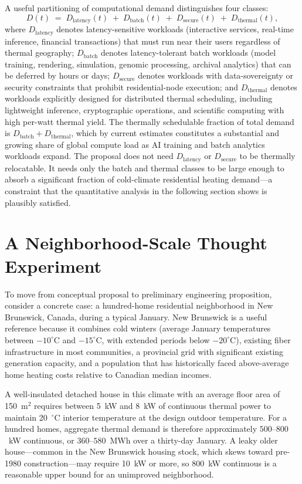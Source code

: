 \documentclass[12pt, oneside]{article}
\begin{document}
A useful partitioning of computational demand distinguishes four classes:
\[
D(t) \;=\; D_{\text{latency}}(t) \;+\; D_{\text{batch}}(t) \;+\; D_{\text{secure}}(t) \;+\; D_{\text{thermal}}(t),
\]
where $D_{\text{latency}}$ denotes latency-sensitive workloads (interactive services, real-time inference, financial transactions) that must run near their users regardless of thermal geography; $D_{\text{batch}}$ denotes latency-tolerant batch workloads (model training, rendering, simulation, genomic processing, archival analytics) that can be deferred by hours or days; $D_{\text{secure}}$ denotes workloads with data-sovereignty or security constraints that prohibit residential-node execution; and $D_{\text{thermal}}$ denotes workloads explicitly designed for distributed thermal scheduling, including lightweight inference, cryptographic operations, and scientific computing with high per-watt thermal yield. The thermally schedulable fraction of total demand is $D_{\text{batch}} + D_{\text{thermal}}$, which by current estimates constitutes a substantial and growing share of global compute load as AI training and batch analytics workloads expand. The proposal does not need $D_{\text{latency}}$ or $D_{\text{secure}}$ to be thermally relocatable. It needs only the batch and thermal classes to be large enough to absorb a significant fraction of cold-climate residential heating demand---a constraint that the quantitative analysis in the following section shows is plausibly satisfied.

\section{A Neighborhood-Scale Thought Experiment}

To move from conceptual proposal to preliminary engineering proposition, consider a concrete case: a hundred-home residential neighborhood in New Brunswick, Canada, during a typical January. New Brunswick is a useful reference because it combines cold winters (average January temperatures between $-10^{\circ}$C and $-15^{\circ}$C, with extended periods below $-20^{\circ}$C), existing fiber infrastructure in most communities, a provincial grid with significant existing generation capacity, and a population that has historically faced above-average home heating costs relative to Canadian median incomes.

A well-insulated detached house in this climate with an average floor area of 150~m$^2$ requires between 5~kW and 8~kW of continuous thermal power to maintain 20~$^{\circ}$C interior temperature at the design outdoor temperature. For a hundred homes, aggregate thermal demand is therefore approximately $500$--$800$~kW continuous, or $360$--$580$~MWh over a thirty-day January. A leaky older house---common in the New Brunswick housing stock, which skews toward pre-1980 construction---may require 10~kW or more, so 800~kW continuous is a reasonable upper bound for an unimproved neighborhood.
\end{document}

